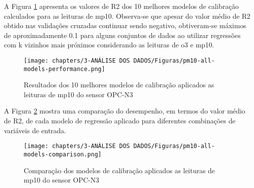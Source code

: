 A Figura \ref{fig:data-pm10-all-models-performance} apresenta os valores de R2 dos 10 melhores modelos de calibração calculados para as leituras de \acrshort{mp10}. Observa-se que apesar do valor médio de R2 obtido nas validações cruzadas continuar sendo negativo, obtiveram-se máximos de aproximadamente 0.1 para alguns conjuntos de dados ao utilizar regressões com k vizinhos mais próximos considerando as leituras de \acrshort{o3} e \acrshort{mp10}.

\begin{figure}[h]
    \centering
    \caption{Resultados dos 10 melhores modelos de calibração aplicados as leituras de \acrshort{mp10} do sensor OPC-N3}
    \texttt{[image: chapters/3-ANÁLISE DOS DADOS/Figuras/pm10-all-models-performance.png]}
    \label{fig:data-pm10-all-models-performance}
\end{figure}

A Figura \ref{fig:data-pm10-all-models-comparison} mostra uma comparação do desempenho, em termos do valor médio de R2, de cada modelo de regressão aplicado para diferentes combinações de variáveis de entrada.

\begin{figure}[h]
    \centering
    \caption{Comparação dos modelos de calibração aplicados as leituras de \acrshort{mp10} do sensor OPC-N3}
    \texttt{[image: chapters/3-ANÁLISE DOS DADOS/Figuras/pm10-all-models-comparison.png]}
    \label{fig:data-pm10-all-models-comparison}
\end{figure}
